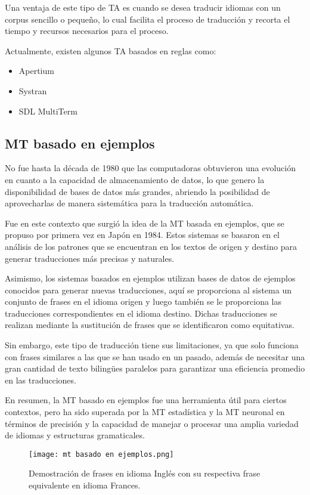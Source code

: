 \documentclass[conference]{IEEEtran}
\begin{document}
Una ventaja de este tipo de TA es cuando se desea traducir idiomas con un corpus sencillo o pequeño, lo cual facilita el proceso de traducción y recorta el tiempo y recursos necesarios para el proceso. 

Actualmente, existen algunos TA basados en reglas como:
\begin{itemize}
    \item Apertium
    \item Systran
    \item SDL MultiTerm
\end{itemize}


\subsection{MT basado en ejemplos}
No fue hasta la década de 1980 que las computadoras obtuvieron una evolución en cuanto a la capacidad de almacenamiento de datos, lo que genero la disponibilidad de bases de datos más grandes, abriendo la posibilidad de aprovecharlas de manera sistemática para la traducción automática.

Fue en este contexto que surgió la idea de la MT basada en ejemplos, que se propuso por primera vez en Japón en 1984. Estos sistemas se basaron en el análisis de los patrones que se encuentran en los textos de origen y destino para generar traducciones más precisas y naturales.

Asimismo, los sistemas basados en ejemplos utilizan bases de datos de ejemplos conocidos para generar nuevas traducciones, aquí se proporciona al sistema un conjunto de frases en el idioma origen y luego también se le proporciona las traducciones correspondientes en el idioma destino.
Dichas traducciones se realizan mediante la sustitución de frases que se identificaron como equitativas.

	Sin embargo, este tipo de traducción tiene sus limitaciones, ya que solo funciona con frases similares a las que se han usado en un pasado, además de necesitar una gran cantidad de texto bilingües paralelos para garantizar una eficiencia promedio en las traducciones.
	
En resumen, la MT basado en ejemplos fue una herramienta útil para ciertos contextos, pero ha sido superada por la MT estadística y la MT neuronal en términos de precisión y la capacidad de manejar o procesar una amplia variedad de idiomas y estructuras gramaticales. 
\begin{figure}[htp]
        \centering
        \texttt{[image: mt basado en ejemplos.png]}
        \label{foto}
        \caption{Demostración de frases en idioma Inglés con su respectiva frase equivalente en idioma Frances.}
    \end{figure}
\end{document}
